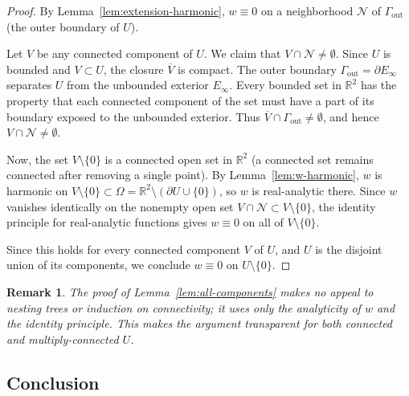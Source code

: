 \documentclass[11pt]{article}
\newtheorem{remark}[theorem]{Remark}
\newcommand{\R}{\mathbb R}
\newcommand{\1}{\mathbf 1}
\begin{document}
\begin{proof}
By Lemma~\ref{lem:extension-harmonic}, $w\equiv 0$ on a neighborhood $\mathcal N$ of
$\Gamma_{\mathrm{out}}$ (the outer boundary of $U$).

Let $V$ be any connected component of $U$. We claim that $V\cap\mathcal N\ne\emptyset$.
Since $U$ is bounded and $V\subset U$, the closure $\overline V$ is compact. The outer
boundary $\Gamma_{\mathrm{out}}=\partial E_\infty$ separates $U$ from the unbounded exterior
$E_\infty$. Every bounded set in $\R^2$ has the property that each connected component
of the set must have a part of its boundary exposed to the unbounded exterior. Thus
$\overline V\cap\Gamma_{\mathrm{out}}\ne\emptyset$, and hence $V\cap\mathcal N\ne\emptyset$.

Now, the set $V\setminus\{0\}$ is a connected open set in $\R^2$ (a connected set remains
connected after removing a single point). By Lemma~\ref{lem:w-harmonic}, $w$ is harmonic
on $V\setminus\{0\}\subset\Omega=\R^2\setminus(\partial U\cup\{0\})$, so $w$ is real-analytic
there. Since $w$ vanishes identically on the nonempty open set $V\cap\mathcal N\subset
V\setminus\{0\}$, the identity principle for real-analytic functions gives $w\equiv 0$
on all of $V\setminus\{0\}$.

Since this holds for every connected component $V$ of $U$, and $U$ is the disjoint union
of its components, we conclude $w\equiv 0$ on $U\setminus\{0\}$.
\end{proof}

\begin{remark}
The proof of Lemma~\ref{lem:all-components} makes no appeal to nesting trees or induction
on connectivity; it uses only the analyticity of $w$ and the identity principle. This makes
the argument transparent for both connected and multiply-connected $U$.
\end{remark}

\subsection{Conclusion}
\end{document}
